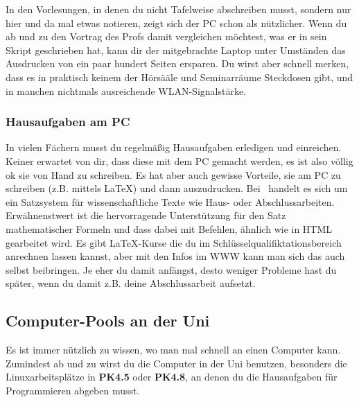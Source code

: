 			In den Vorlesungen, in denen du nicht Tafelweise abschreiben musst, sondern nur hier und da mal etwas notieren, zeigt sich der PC schon als nützlicher. Wenn du ab und zu den Vortrag des Profs damit vergleichen möchtest, was er in sein Skript geschrieben hat, kann dir der mitgebrachte Laptop unter Umständen das Ausdrucken von ein paar hundert Seiten ersparen. Du wirst aber schnell merken, dass es in praktisch keinem der Hörsääle und Seminarräume Steckdosen gibt, und in manchen nichtmals ausreichende WLAN-Signalstärke.

		\subsubsection{Hausaufgaben am PC}
			In vielen Fächern musst du regelmäßig
			Hausaufgaben erledigen und einreichen. Keiner
			erwartet von dir, dass diese mit dem PC gemacht
			werden, es ist also völlig ok sie von Hand zu
			schreiben. Es hat aber auch gewisse Vorteile,
			sie am PC zu schreiben (z.B. mittels \LaTeX) und
			dann auszudrucken. Bei \LateX\ handelt es sich
			um ein Satzsystem für wissenschaftliche
			Texte wie Haus- oder Abschlussarbeiten.
			Erwähnenstwert ist die hervorragende
			Unterstützung für den Satz mathematischer
			Formeln und dass dabei mit Befehlen, ähnlich wie
			in HTML gearbeitet wird. Es gibt \LaTeX-Kurse die du im Schlüsselqualifiktationsbereich anrechnen lassen kannst, aber mit den Infos im WWW kann man sich das auch selbst beibringen. Je eher du damit anfängst, desto weniger Probleme hast du später, wenn du damit z.B. deine Abschlussarbeit aufsetzt.

		\subsection{Computer-Pools an der Uni}
			Es ist immer nützlich zu wissen, wo man mal schnell an einen Computer kann. Zumindest ab und zu wirst du die Computer in der Uni benutzen, besonders die Linuxarbeitsplätze in \textbf{PK4.5} oder \textbf{PK4.8}, an denen du die Hausaufgaben für Programmieren abgeben musst.


